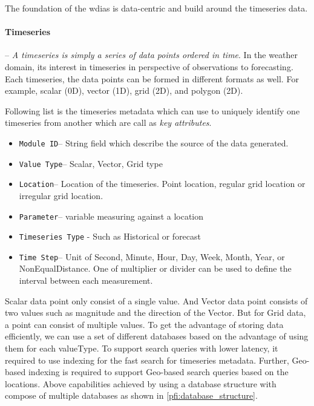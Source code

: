 \documentclass[conference]{IEEEtran}
\begin{document}
The foundation of the \acrshort{wdias} is data-centric and build around the timeseries data.

\paragraph{Timeseries}-- \emph{A timeseries is simply a series of data points ordered in time}. In the weather domain, its interest in timeseries in perspective of observations to forecasting. Each timeseries, the data points can be formed in different formats as well. For example, scalar (0D), vector (1D), grid (2D), and polygon (2D).

Following list is the timeseries metadata which can use to uniquely identify one timeseries from another which are call as \emph{key attributes}.

\begin{itemize}
    \item \texttt{Module ID}--  String field which describe the source of the data generated.
    \item \texttt{Value Type}--  Scalar, Vector, Grid type
    \item \texttt{Location}-- Location of the timeseries. Point location, regular grid location or irregular grid location.
    \item \texttt{Parameter}-- variable measuring against a location
    \item \texttt{Timeseries Type} - Such as Historical or forecast
    \item \texttt{Time Step}-- Unit of Second, Minute, Hour, Day, Week, Month, Year, or NonEqualDistance. One of multiplier or divider can be used to define the interval between each measurement.
\end{itemize}

Scalar data point only consist of a single value. And Vector data point consists of two values such as magnitude and the direction of the Vector. But for Grid data, a point can consist of multiple values. To get the advantage of storing data efficiently, we can use a set of different databases based on the advantage of using them for each valueType. To support search queries with lower latency, it required to use indexing for the fast search for timeseries metadata. Further, Geo-based indexing is required to support Geo-based search queries based on the locations. Above capabilities achieved by using a database structure with compose of multiple databases as shown in \cref{pfi:database_structure}.
\end{document}
